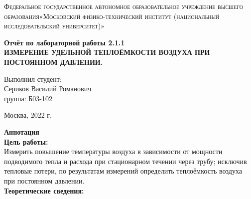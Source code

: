 \documentclass[a4paper, 12pt]{article}%
\begin{document}
	\begin{titlepage}
		\begin{center}
			\textsc{Федеральное государственное автономное образовательное учреждение высшего образования«Московский физико-технический институт (национальный исследовательский университет)»\\[5mm]
			}
			
			\vfill
			
			\textbf{Отчёт по лабораторной работы 2.1.1\\[3mm]
				ИЗМЕРЕНИЕ УДЕЛЬНОЙ
				ТЕПЛОЁМКОСТИ ВОЗДУХА ПРИ
				ПОСТОЯННОМ ДАВЛЕНИИ.
				\\[50mm]
			}
			
		\end{center}
		
		\hfill
		\begin{minipage}{.5\textwidth}
			Выполнил студент:\\[2mm]
			Сериков Василий Романович\\[2mm]
			группа: Б03-102\\[5mm]
			
		\end{minipage}
		\vfill
		\begin{center}
			Москва, 2022 г.
		\end{center}
		
	\end{titlepage}
	
	\newpage
	\textbf{Аннотация}\\
	
	
	\textbf{Цель работы: }\\
	
	Измерить повышение температуры воздуха в зависимости от мощности подводимого тепла и расхода при стационарном течении через трубу; исключив тепловые потери, по результатам измерений определить теплоёмкость воздуха при постоянном давлении.\\
	
	
	\textbf{Теоретические сведения: } \\
	
\end{document}
